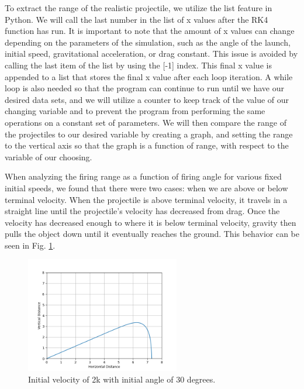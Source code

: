 \documentclass[12pt]{iopart} %
\begin{document}
To extract the range of the realistic projectile, we utilize the list feature in Python.
We will call the last number in the list of x values after the RK4 function has run.
It is important to note that the amount of x values can change depending on the parameters of the simulation, such as the angle of the launch, initial speed, gravitational acceleration, or drag constant.
This issue is avoided by calling the last item of the list by using the [-1] index.
This final x value is appended to a list that stores the final x value after each loop iteration.
A while loop is also needed so that the program can continue to run until we have our desired data sets, and we will utilize a counter to keep track of the value of our changing variable and to prevent the program from performing the same operations on a constant set of parameters.
We will then compare the range of the projectiles to our desired variable by creating a graph, and setting the range to the vertical axis so that the graph is a function of range, with respect to the variable of our choosing.

When analyzing the firing range as a function of firing angle for various fixed initial speeds, we found that there were two cases: when we are above or below terminal velocity.
When the projectile is above terminal velocity, it travels in a straight line until the projectile's velocity has decreased from drag.
Once the velocity has decreased enough to where it is below terminal velocity, gravity then pulls the object down until it eventually reaches the ground.
This behavior can be seen in Fig. \ref{fig:figure6}.


\begin{figure}[h!tbp]
  \begin{center}
 \item[]\includegraphics[width=0.6\textwidth]{figure6.png}
  \caption{\label{fig:figure6}
  Initial velocity of 2k with initial angle of 30 degrees.
  }
  \end{center}
\end{figure}
\end{document}
